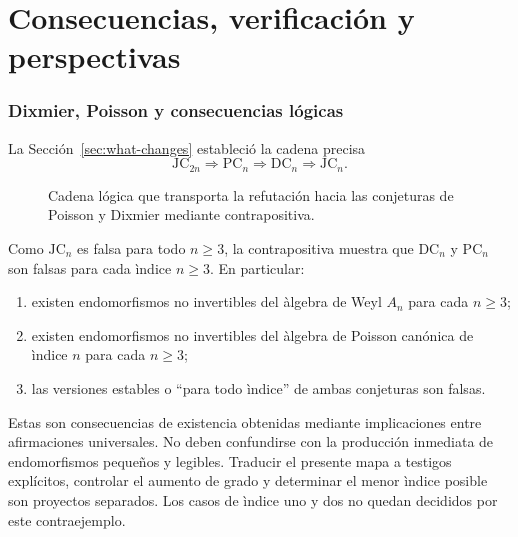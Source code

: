 \documentclass[11pt]{article}
\theoremstyle{definition}
\theoremstyle{remark}
\begin{document}
\clearpage
\part{Consecuencias, verificaci\'on y perspectivas}

\section{Dixmier, Poisson y consecuencias l\'ogicas}

La Secci\'on~\ref{sec:what-changes} estableci\'o la cadena precisa
\[
\mathrm{JC}_{2n}\Longrightarrow
\mathrm{PC}_n\Longrightarrow
\mathrm{DC}_n\Longrightarrow
\mathrm{JC}_n.
\]
\begin{figure}[htbp]
\centering
{}
\caption{Cadena l\'ogica que transporta la refutaci\'on hacia las conjeturas
de Poisson y Dixmier mediante contrapositiva.}
\label{fig:logical-consequences}
\end{figure}
Como $\mathrm{JC}_n$ es falsa para todo $n\geq3$, la contrapositiva muestra
que $\mathrm{DC}_n$ y $\mathrm{PC}_n$ son falsas para cada \`indice $n\geq3$.
En particular:

\begin{enumerate}
\item existen endomorfismos no invertibles del \`algebra de Weyl $A_n$ para
cada $n\geq3$;
\item existen endomorfismos no invertibles del \`algebra de Poisson can\'onica
de \`indice $n$ para cada $n\geq3$;
\item las versiones estables o ``para todo \`indice'' de ambas conjeturas son
falsas.
\end{enumerate}

Estas son consecuencias de existencia obtenidas mediante implicaciones entre
afirmaciones universales. No deben confundirse con la producci\'on inmediata de
endomorfismos peque\~nos y legibles. Traducir el presente mapa a testigos
expl\'icitos, controlar el aumento de grado y determinar el menor \`indice
posible son proyectos separados. Los casos de \`indice uno y dos no quedan
decididos por este contraejemplo.
\end{document}
